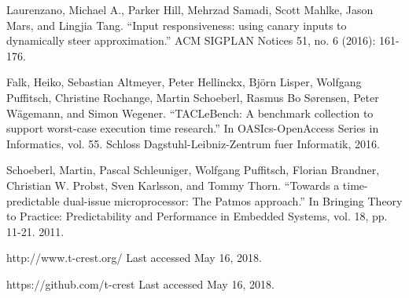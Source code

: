 \begin{thebibliography}{}
  Laurenzano, Michael A., Parker Hill, Mehrzad Samadi, Scott Mahlke, Jason Mars, and Lingjia Tang. ``Input responsiveness: using canary inputs to dynamically steer approximation.'' ACM SIGPLAN Notices 51, no. 6 (2016): 161-176.

  Falk, Heiko, Sebastian Altmeyer, Peter Hellinckx, Björn Lisper, Wolfgang Puffitsch, Christine Rochange, Martin Schoeberl, Rasmus Bo Sørensen, Peter Wägemann, and Simon Wegener. ``TACLeBench: A benchmark collection to support worst-case execution time research.'' In OASIcs-OpenAccess Series in Informatics, vol. 55. Schloss Dagstuhl-Leibniz-Zentrum fuer Informatik, 2016.
  
  Schoeberl, Martin, Pascal Schleuniger, Wolfgang Puffitsch, Florian Brandner, Christian W. Probst, Sven Karlsson, and Tommy Thorn. ``Towards a time-predictable dual-issue microprocessor: The Patmos approach.'' In Bringing Theory to Practice: Predictability and Performance in Embedded Systems, vol. 18, pp. 11-21. 2011.

  http://www.t-crest.org/
  Last accessed May 16, 2018.

  https://github.com/t-crest
  Last accessed May 16, 2018.
  
\end{thebibliography}
